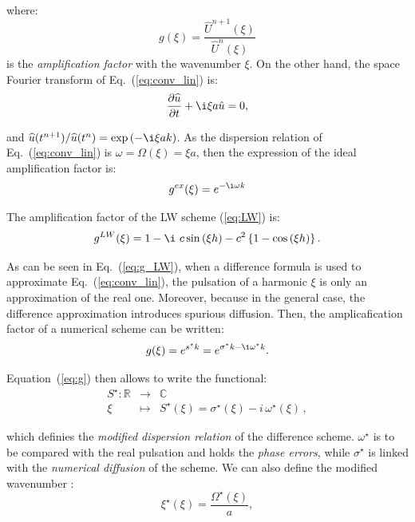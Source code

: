 \noindent where:
$$ g(\xi)=\frac{\widehat{U}^{n+1}(\xi)}{\widehat{U}^{n}(\xi)} $$
is the \emph{amplification factor} with the wavenumber $\xi$. On the other hand, the space Fourier transform of Eq.~(\ref{eq:conv_lin}) is:
\begin{equation}
\label{eq:conv_lin_Fourier}
\ddt{\widehat{u}} + \i \xi a \hat{u} = 0,
\end{equation}

\noindent and $\widehat{u}(t^{n+1})/\widehat{u}(t^{n}) = \exp \left(-\i \xi a k \right)$. As the dispersion relation of Eq.~(\ref{eq:conv_lin}) is $\omega = \Omega(\xi) = \xi a$, then the expression of the ideal amplification factor is: 
\begin{equation}
\label{eq:exact_g}
g^{ex}(\xi) = e^{- \i \omega k}
\end{equation}

\vskip8mm

\begin{example}
The amplification factor of the LW scheme (\ref{eq:LW}) is:
\begin{equation}
\label{eq:g_LW}
g^{LW}(\xi) = 1 - \i \ c \sin{(\xi h)} - c^2 \left\{1-\cos{(\xi h)}\right\}.
\end{equation}
\end{example}

\vskip8mm

\noindent As can be seen in Eq.~(\ref{eq:g_LW}), when a difference formula is used to approximate Eq.~(\ref{eq:conv_lin}), the pulsation of a harmonic $\xi$ is only an approximation of the real one. Moreover, because in the general case, the difference approximation introduces spurious diffusion. Then, the amplicafication factor of a numerical scheme can be written:
\begin{equation}
\label{eq:g}
g(\xi) = e^{s^{\star} k} = e^{\sigma^{\star}k - \i \omega^{\star} k}.
\end{equation}

\noindent Equation~(\ref{eq:g}) then allows to write the functional: 
$$ \begin{array}{rcl}
   S^{\star}:\mathbb{R} &\longrightarrow& \mathbb{C} \\
   \xi &\longmapsto& S^\star(\xi)=\sigma^\star(\xi)-i\,\omega^\star(\xi) \, , 
   \end{array}
$$

\noindent which definies the \emph{modified dispersion relation} of the difference scheme. $\omega^{\star}$ is to be compared with the real pulsation and holds the \emph{phase errors}, while $\sigma^{\star}$ is linked with the \emph{numerical diffusion} of the scheme. We can also define the modified wavenumber \cite{Hirsch:1988}:
\begin{equation}
\label{eq:kstar}
\xi^{\star}(\xi) = \frac{\Omega^{\star}(\xi)}{a} ,
\end{equation}

